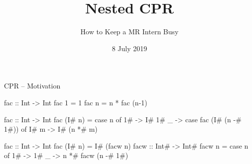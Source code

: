 \documentclass{haskellbeamer}
\title{Nested CPR}
\subtitle{How to Keep a MR Intern Busy}
\date{8 July 2019}
\begin{document}
\maketitle

\begin{frame}[fragile]{CPR -- Motivation}
  \begin{center}
    \begin{minipage}{0.7\textwidth}
      \begin{overprint}
        \begin{haskell}
          fac :: Int -> Int
          fac 1 = 1
          fac n = n * fac (n-1) 
        \end{haskell}
        \begin{haskell}
          fac :: Int -> Int
          fac (I# n) = case n of
            1# -> I# 1#
            _  -> case fac (I# (n -# 1#)) of
              I# m -> I# (n *# m)
        \end{haskell}
        \begin{haskell}
          fac :: Int -> Int
          fac (I# n) = I# (facw n)
          facw :: Int# -> Int#
          facw n = case n of
            1# -> 1#
            _  -> n *# facw (n -# 1#)
        \end{haskell}
      \end{overprint}
    \end{minipage}
  \end{center}
\end{frame}
\end{document}
